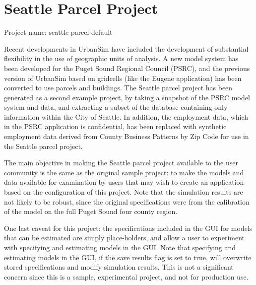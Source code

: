 \section{Seattle Parcel Project}

Project name: seattle-parcel-default

Recent developments in UrbanSim have included the development of substantial flexibility in the use of geographic units of analysis.  A new model system has been developed for the Puget Sound Regional Council (PSRC), and the previous version of UrbanSim based on gridcells (like the Eugene application) has been converted to use parcels and buildings.  The Seattle parcel project has been generated as a second example project, by taking a snapshot of the PSRC model system and data, and extracting a subset of the database containing only information within the City of Seattle.  In addition, the employment data, which in the PSRC application is confidential, has been replaced with synthetic employment data derived from County Business Patterns by Zip Code for use in the Seattle parcel project.

The main objective in making the Seattle parcel project available to the user community is the same as the original sample project: to make the models and data available for examination by users that may wish to create an application based on the configuration of this project.  Note that the simulation results are not likely to be robust, since the original specifications were from the calibration of the model on the full Puget Sound four county region.

One last caveat for this project: the specifications included in the GUI for models that can be estimated are simply place-holders, and allow a user to experiment with specifying and estimating models in the GUI.  Note that specifying and estimating models in the GUI, if the save results flag is set to true, will overwrite stored specifications and modify simulation results.  This is not a significant concern since this is a sample, experimental project, and not for production use.